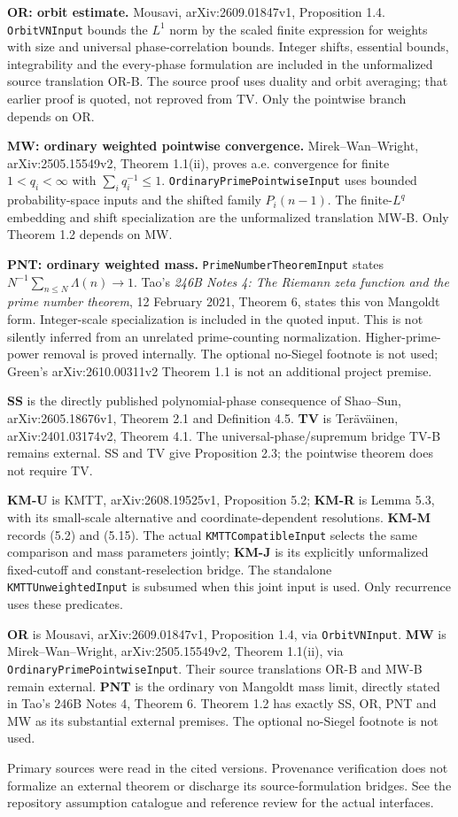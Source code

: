\textbf{OR: orbit estimate.} Mousavi, arXiv:2609.01847v1, Proposition 1.4. \texttt{OrbitVNInput} bounds the $L^1$ norm by the scaled finite expression for weights with size and universal phase-correlation bounds. Integer shifts, essential bounds, integrability and the every-phase formulation are included in the unformalized source translation OR-B. The source proof uses duality and orbit averaging; that earlier proof is quoted, not reproved from TV. Only the pointwise branch depends on OR.

\textbf{MW: ordinary weighted pointwise convergence.} Mirek--Wan--Wright, arXiv:2505.15549v2, Theorem 1.1(ii), proves a.e. convergence for finite $1<q_i<\infty$ with $\sum_iq_i^{-1}\leq1$. \texttt{OrdinaryPrimePointwiseInput} uses bounded probability-space inputs and the shifted family $P_i(n-1)$. The finite-$L^q$ embedding and shift specialization are the unformalized translation MW-B. Only Theorem 1.2 depends on MW.

\textbf{PNT: ordinary weighted mass.} \texttt{PrimeNumberTheoremInput} states $N^{-1}\sum_{n\leq N}\Lambda(n)\to1$. Tao's \emph{246B Notes 4: The Riemann zeta function and the prime number theorem}, 12 February 2021, Theorem 6, states this von Mangoldt form. Integer-scale specialization is included in the quoted input. This is not silently inferred from an unrelated prime-counting normalization. Higher-prime-power removal is proved internally. The optional no-Siegel footnote is not used; Green's arXiv:2610.00311v2 Theorem 1.1 is not an additional project premise.

\else
\textbf{SS} is the directly published polynomial-phase consequence of Shao--Sun, arXiv:2605.18676v1, Theorem 2.1 and Definition 4.5. \textbf{TV} is Ter\"av\"ainen, arXiv:2401.03174v2, Theorem 4.1. The universal-phase/supremum bridge TV-B remains external. SS and TV give Proposition 2.3; the pointwise theorem does not require TV.

\textbf{KM-U} is KMTT, arXiv:2608.19525v1, Proposition 5.2; \textbf{KM-R} is Lemma 5.3, with its small-scale alternative and coordinate-dependent resolutions. \textbf{KM-M} records (5.2) and (5.15). The actual \texttt{KMTTCompatibleInput} selects the same comparison and mass parameters jointly; \textbf{KM-J} is its explicitly unformalized fixed-cutoff and constant-reselection bridge. The standalone \texttt{KMTTUnweightedInput} is subsumed when this joint input is used. Only recurrence uses these predicates.

\textbf{OR} is Mousavi, arXiv:2609.01847v1, Proposition 1.4, via \texttt{OrbitVNInput}. \textbf{MW} is Mirek--Wan--Wright, arXiv:2505.15549v2, Theorem 1.1(ii), via \texttt{OrdinaryPrimePointwiseInput}. Their source translations OR-B and MW-B remain external. \textbf{PNT} is the ordinary von Mangoldt mass limit, directly stated in Tao's 246B Notes 4, Theorem 6. Theorem 1.2 has exactly SS, OR, PNT and MW as its substantial external premises. The optional no-Siegel footnote is not used.
\fi

Primary sources were read in the cited versions. Provenance verification does not formalize an external theorem or discharge its source-formulation bridges. See the repository assumption catalogue and reference review for the actual interfaces.
